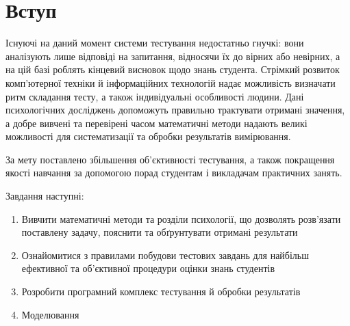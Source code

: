 \chapter*{Вступ}

Існуючі на даний момент системи тестування недостатньо гнучкі: вони
аналізують лише відповіді на запитання, відносячи їх до вірних або невірних,
а на цій базі роблять кінцевий висновок щодо знань студента.
Стрімкий розвиток комп’ютерної техніки й інформаційних технологій надає
можливість визначати ритм складання тесту, а також індивідуальні особливості
людини.
Дані психологічних досліджень допоможуть правильно трактувати отримані
значення, а добре вивчені та перевірені часом математичні методи надають
великі можливості для систематизації та обробки результатів вимірювання.

За мету поставлено збільшення об’єктивності тестування, а також покращення
якості навчання за допомогою порад студентам і викладачам практичних занять.

Завдання наступні:
\begin{enumerate}
  \item
    Вивчити математичні методи та розділи психології, що дозволять розв’язати
    поставлену задачу, пояснити та обґрунтувати отримані результати
  \item
    Ознайомитися з правилами побудови тестових завдань для найбільш
    ефективної та об’єктивної процедури оцінки знань студентів
  \item
    Розробити програмний комплекс тестування й обробки результатів
  \item
    Моделювання
\end{enumerate}

